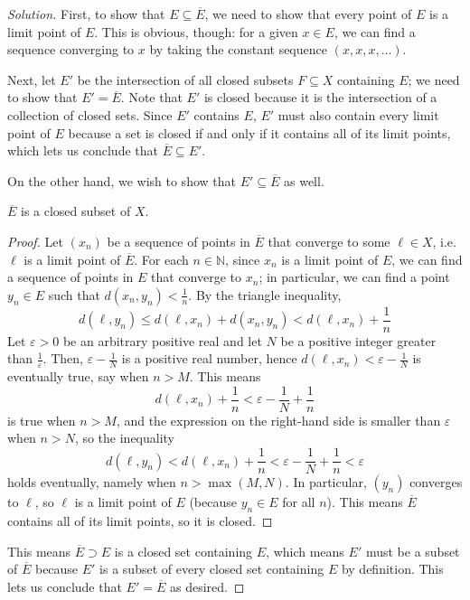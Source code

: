 \documentclass[11pt]{scrartcl}
\providecommand{\ol}{\overline}
\providecommand{\eps}{\varepsilon}
\providecommand{\NN}{\mathbb N}
\newenvironment{soln}{\begin{proof}[Solution]}{\end{proof}}
\begin{document}
\begin{soln}
	First, to show that $E\subseteq \ol E$, we need to show that
	every point of $E$ is a limit point of $E$.
	This is obvious, though: for a given $x\in E$,
	we can find a sequence converging to $x$
	by taking the constant sequence $(x, x, x, \dots)$.
	
	Next, let $E'$ be the intersection of
	all closed subsets $F\subseteq X$ containing $E$;
	we need to show that $E' = \ol E$.
	Note that $E'$ is closed because it is the intersection of
	a collection of closed sets.
	Since $E'$ contains $E$, $E'$ must also contain every limit point of $E$
	because a set is closed if and only if it contains all of its limit points,
	which lets us conclude that $\ol E\subseteq E'$.
	
	On the other hand, we wish to show that $E'\subseteq \ol E$ as well.
	\begin{claim}
		$\ol E$ is a closed subset of $X$.
	\end{claim}
	\begin{proof}
		Let $(x_n)$ be a sequence of points in $\ol E$
		that converge to some $\ell\in X$,
		i.e. $\ell$ is a limit point of $\ol E$.
		For each $n\in\NN$, since $x_n$ is a limit point of $E$,
		we can find a sequence of points in $E$ that converge to $x_n$;
		in particular, we can find a point $y_n\in E$ such that
		$d(x_n, y_n) < \frac 1n$.
		By the triangle inequality,
		\[d(\ell, y_n) \le d(\ell, x_n) + d(x_n, y_n) <
		d(\ell, x_n) + \frac 1n\]
		Let $\eps > 0$ be an arbitrary positive real
		and let $N$ be a positive integer greater than $\frac 1\eps$.
		Then, $\eps - \frac 1N$ is a positive real number,
		hence $d(\ell, x_n) < \eps - \frac 1N$ is eventually true,
		say when $n > M$. This means
		\[d(\ell, x_n) + \frac 1n < \eps - \frac 1N + \frac 1n\]
		is true when $n > M$, and the expression on the right-hand side
		is smaller than $\eps$ when $n > N$, so the inequality
		\[d(\ell, y_n) < d(\ell, x_n) + \frac 1n <
		\eps - \frac 1N + \frac 1n < \eps\]
		holds eventually, namely when $n > \max(M, N)$.
		In particular, $(y_n)$ converges to $\ell$,
		so $\ell$ is a limit point of $E$ (because $y_n\in E$ for all $n$).
		This means $\ol E$ contains all of its limit points,
		so it is closed.
	\end{proof}
	This means $\ol E\supset E$ is a closed set containing $E$,
	which means $E'$ must be a subset of $\ol E$ because $E'$
	is a subset of every closed set containing $E$ by definition.
	This lets us conclude that $E' = \ol E$ as desired.
\end{soln}
\end{document}
